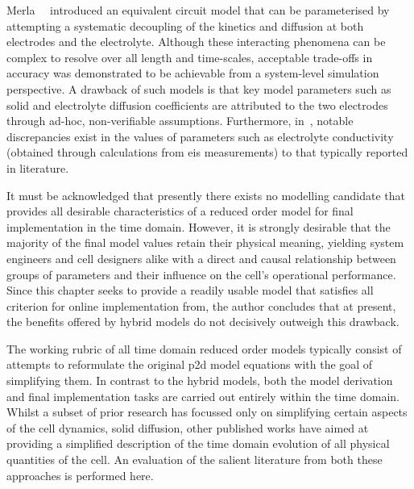 Merla~\etal{}~\cite{Merla2018} introduced  an equivalent circuit model  that can
be  parameterised by  attempting a  systematic  decoupling of  the kinetics  and
diffusion at  both electrodes  and the  electrolyte. Although  these interacting
phenomena can be complex to resolve  over all length and time-scales, acceptable
trade-offs in  accuracy was  demonstrated to be  achievable from  a system-level
simulation perspective. A  drawback of such models is that  key model parameters
such  as  solid  and  electrolyte   diffusion  coefficients  are  attributed  to
the  two electrodes  through  ad-hoc,  non-verifiable assumptions.  Furthermore,
in~\cite{Merla2018},  notable discrepancies  exist in  the values  of parameters
such as  electrolyte conductivity (obtained through  calculations from \gls{eis}
measurements) to  that typically reported  in literature. 


It must be acknowledged that presently  there exists no modelling candidate that
provides  all desirable  characteristics  of  a reduced  order  model for  final
implementation in  the time domain. However,  it is strongly desirable  that the
majority  of the  final model  values  retain their  physical meaning,  yielding
system engineers and cell designers alike  with a direct and causal relationship
between  groups of  parameters and  their  influence on  the cell's  operational
performance. Since  this chapter seeks  to provide  a readily usable  model that
satisfies  all  criterion  for online  implementation
from, the  author  concludes that  at  present, the  benefits
offered by hybrid models do not decisively outweigh this drawback.


The working rubric of all time  domain reduced order models typically consist of
attempts to reformulate the original \gls{p2d}  model equations with the goal of
simplifying them.  In contrast to the  hybrid models, both the  model derivation
and  final  implementation  tasks  are  carried out  entirely  within  the  time
domain.  Whilst a  subset of  prior research  has focussed  only on  simplifying
certain aspects  of the  cell dynamics, \eg{}  solid diffusion,  other published
works  have aimed  at  providing a  simplified description  of  the time  domain
evolution of all  physical quantities of the cell. An  evaluation of the salient
literature  from both  these  approaches is  performed here.


